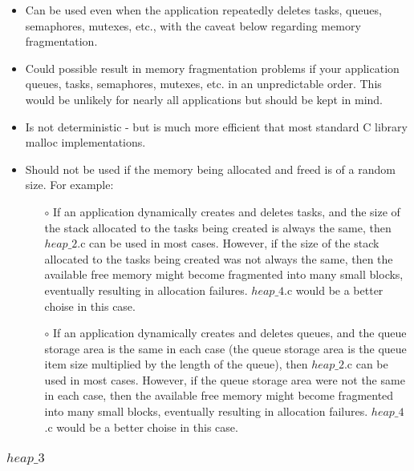 \documentclass[12pt]{article}
\begin{document}
\begin{itemize}
	\item Can be used even when the application repeatedly deletes tasks, queues, semaphores, mutexes, etc., with the caveat below regarding memory fragmentation.
	
	
	\item Could possible result in memory fragmentation problems if your application queues, tasks, semaphores, mutexes, etc. in an unpredictable order. This would be unlikely for nearly all applications but should be kept in mind.
		
	\item Is not deterministic - but is much more efficient that most standard C library malloc implementations.
	
	\item Should not be used if the memory being allocated and freed is of a random size. For example:
	
	\begin{itemize}
	
		\item[$\circ$] If an application dynamically creates and deletes tasks, and the size of the stack allocated to the tasks being created is always the same, then  $heap\_2$.c can be used in most cases. However, if the size of the stack allocated to the tasks being created was not always the same, then the available free memory might become fragmented into many small blocks, eventually resulting in allocation failures.  $heap\_4$.c would be a better choise in this case.
		
		\item[$\circ$] If an application dynamically creates and deletes queues, and the queue storage area is the same in each case (the queue storage area is the queue item size multiplied by the length of the queue), then  $heap\_2$.c can be used in most cases. However, if the queue storage area were not the same in each case, then the available free memory might become fragmented into many small blocks, eventually resulting in allocation failures.  $heap\_4$.c would be a better choise in this case.
		
	\end{itemize}
	
	

\end{itemize}


\subsubsection{$heap\_3$}	
\end{document}
